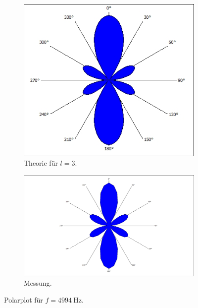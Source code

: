 \begin{figure}
    \centering
    \begin{subfigure}[b]{0.475\textwidth}
        \centering
        \begin{minipage}{\textwidth}\includegraphics[width=\textwidth]{ressources/l3.jpg}\end{minipage}
        \caption[]%
        {{\small Theorie für $l=3$.}}
        \label{fig:2_12a}
    \end{subfigure}
    \hfill
    \begin{subfigure}[b]{0.475\textwidth}
        \centering
        \begin{minipage}{\textwidth}\includegraphics[width=\textwidth]{messdaten/2_3_4994.jpg}\end{minipage}
        \caption[]%
        {{\small Messung.}}
        \label{fig:2_12b}
    \end{subfigure}
    \caption[]
    {Polarplot für $f=\SI{4994}{\hertz}$.}
    \label{fig:2_12}
\end{figure}
